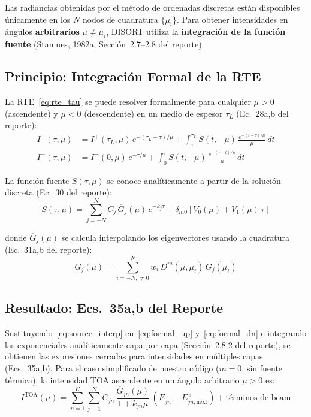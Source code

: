 \documentclass[a4paper,11pt]{article}
\begin{document}
Las radiancias obtenidas por el m\'etodo de ordenadas discretas est\'an
disponibles \'unicamente en los $N$ nodos de cuadratura $\{\mu_i\}$.  Para
obtener intensidades en \'angulos \textbf{arbitrarios} $\mu \neq \mu_i$, DISORT
utiliza la \textbf{integraci\'on de la funci\'on fuente} (Stamnes, 1982a;
Secci\'on~2.7--2.8 del reporte).

\subsection{Principio: Integraci\'on Formal de la RTE}

La RTE~\eqref{eq:rte_tau} se puede resolver formalmente para cualquier $\mu > 0$
(ascendente) y $\mu < 0$ (descendente) en un medio de espesor $\tau_L$
(Ec.~28a,b del reporte):
\begin{align}
    I^+(\tau,\mu) &= I^+(\tau_L,\mu)\,e^{-(\tau_L-\tau)/\mu}
    + \int_{\tau}^{\tau_L} S(t,+\mu)\,\frac{e^{-(t-\tau)/\mu}}{\mu}\,dt
    \label{eq:formal_up}\\
    I^-(\tau,\mu) &= I^-(0,\mu)\,e^{-\tau/\mu}
    + \int_{0}^{\tau} S(t,-\mu)\,\frac{e^{-(\tau-t)/\mu}}{\mu}\,dt
    \label{eq:formal_dn}
\end{align}

La funci\'on fuente $S(\tau,\mu)$ se conoce anal\'iticamente a partir de la
soluci\'on discreta (Ec.~30 del reporte):
\begin{equation}\label{eq:source_interp}
    S(\tau,\mu) = \sum_{j=-N}^{N} C_j\,\overline{G}_j(\mu)\,e^{-k_j\tau}
    + \delta_{m0}\left[V_0(\mu) + V_1(\mu)\,\tau\right]
\end{equation}

donde $\overline{G}_j(\mu)$ se calcula interpolando los eigenvectores usando la
cuadratura (Ec.~31a,b del reporte):
\begin{equation}
    \overline{G}_j(\mu) = \sum_{i=-N,\neq 0}^{N} w_i\,D^m(\mu,\mu_i)\,G_j(\mu_i)
\end{equation}

\subsection{Resultado: Ecs.~35a,b del Reporte}

Sustituyendo~\eqref{eq:source_interp} en~\eqref{eq:formal_up}
y~\eqref{eq:formal_dn} e integrando las exponenciales anal\'iticamente capa por
capa (Secci\'on~2.8.2 del reporte), se obtienen las expresiones cerradas para
intensidades en m\'ultiples capas (Ecs.~35a,b).  Para el caso simplificado de
nuestro c\'odigo ($m=0$, sin fuente t\'ermica), la intensidad TOA ascendente
en un \'angulo arbitrario $\mu > 0$ es:
\begin{equation}\label{eq:interp_toa}
    \boxed{I^{\text{TOA}}(\mu) = \sum_{n=1}^{K}\sum_{j=1}^{N}
    C_{jn}\,\frac{\overline{G}_{jn}(\mu)}{1+k_{jn}\mu}\,
    \left(E^+_{jn} - E^+_{jn,\text{next}}\right)
    + \text{t\'erminos de beam}}
\end{equation}
\end{document}
